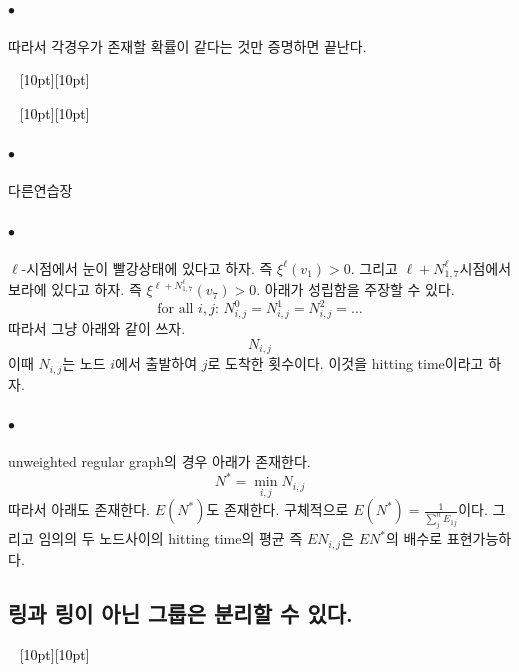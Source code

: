 \documentclass[12pt,oneside,english,a4paper]{article}
\newcommand{\dash}{\noindent \newline\textcolor{black}{\hrulefill~ \raisebox{-2.5pt}[10pt][10pt]{\leafright \decofourleft \decothreeleft  \aldineright \decotwo \floweroneleft \decoone   \floweroneright \decotwo \aldineleft\decothreeright \decofourright \leafleft} ~  \hrulefill}}
\def\ck{\paragraph{\LARGE$\bullet$}\LARGE}
\begin{document}
\ck 따라서 각경우가 존재할 확률이 같다는 것만 증명하면 끝난다. 

\dash 

\dash

\ck 다른연습장 
\ck $\ell$-시점에서 눈이 빨강상태에 있다고 하자. 즉 $\xi^{\ell}(v_1)>0$. 그리고 $\ell+N_{1,7}^{\ell}$시점에서 보라에 있다고 하자. 즉 $\xi^{\ell+N_{1,7}^{\ell}}(v_7)>0$. 아래가 성립함을 주장할 수 있다.
\[
\mbox{for all $i, j$: } N_{i,j}^{0}=N_{i,j}^{1}=N_{i,j}^{2}=\dots
\]
따라서 그냥 아래와 같이 쓰자. 
\[
N_{i,j}
\]
이때 $N_{i,j}$는 노드 $i$에서 출발하여 $j$로 도착한 횟수이다. 이것을 hitting time이라고 하자. 

\ck unweighted regular graph의 경우 아래가 존재한다. 
\[
N^*=\min_{i,j} N_{i,j}
\]
따라서 아래도 존재한다. $E(N^*)$도 존재한다. 구체적으로 $E(N^*)=\frac{1}{\sum_{j}^{n}E_{1j}}$이다. 그리고 임의의 두 노드사이의 hitting time의 평균 즉 $EN_{i,j}$은 $EN^*$의 배수로 표현가능하다. 

\subsection{링과 링이 아닌 그룹은 분리할 수 있다.}
\dash 
\end{document}

